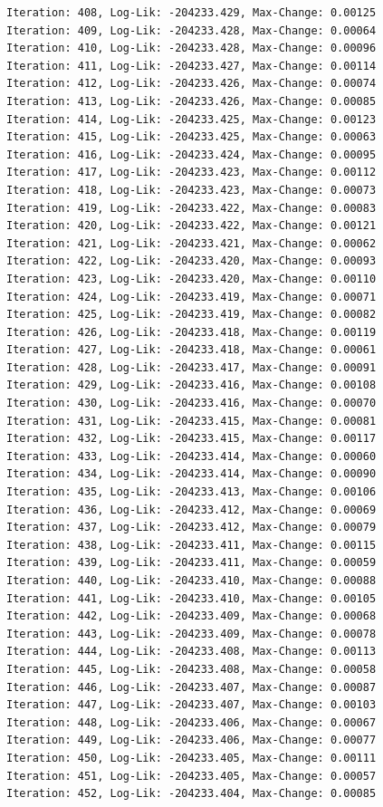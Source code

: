 \documentclass[
  letterpaper,
  DIV=11,
  numbers=noendperiod]{scrreport}
\begin{document}
\begin{verbatim}
Iteration: 408, Log-Lik: -204233.429, Max-Change: 0.00125
Iteration: 409, Log-Lik: -204233.428, Max-Change: 0.00064
Iteration: 410, Log-Lik: -204233.428, Max-Change: 0.00096
Iteration: 411, Log-Lik: -204233.427, Max-Change: 0.00114
Iteration: 412, Log-Lik: -204233.426, Max-Change: 0.00074
Iteration: 413, Log-Lik: -204233.426, Max-Change: 0.00085
Iteration: 414, Log-Lik: -204233.425, Max-Change: 0.00123
Iteration: 415, Log-Lik: -204233.425, Max-Change: 0.00063
Iteration: 416, Log-Lik: -204233.424, Max-Change: 0.00095
Iteration: 417, Log-Lik: -204233.423, Max-Change: 0.00112
Iteration: 418, Log-Lik: -204233.423, Max-Change: 0.00073
Iteration: 419, Log-Lik: -204233.422, Max-Change: 0.00083
Iteration: 420, Log-Lik: -204233.422, Max-Change: 0.00121
Iteration: 421, Log-Lik: -204233.421, Max-Change: 0.00062
Iteration: 422, Log-Lik: -204233.420, Max-Change: 0.00093
Iteration: 423, Log-Lik: -204233.420, Max-Change: 0.00110
Iteration: 424, Log-Lik: -204233.419, Max-Change: 0.00071
Iteration: 425, Log-Lik: -204233.419, Max-Change: 0.00082
Iteration: 426, Log-Lik: -204233.418, Max-Change: 0.00119
Iteration: 427, Log-Lik: -204233.418, Max-Change: 0.00061
Iteration: 428, Log-Lik: -204233.417, Max-Change: 0.00091
Iteration: 429, Log-Lik: -204233.416, Max-Change: 0.00108
Iteration: 430, Log-Lik: -204233.416, Max-Change: 0.00070
Iteration: 431, Log-Lik: -204233.415, Max-Change: 0.00081
Iteration: 432, Log-Lik: -204233.415, Max-Change: 0.00117
Iteration: 433, Log-Lik: -204233.414, Max-Change: 0.00060
Iteration: 434, Log-Lik: -204233.414, Max-Change: 0.00090
Iteration: 435, Log-Lik: -204233.413, Max-Change: 0.00106
Iteration: 436, Log-Lik: -204233.412, Max-Change: 0.00069
Iteration: 437, Log-Lik: -204233.412, Max-Change: 0.00079
Iteration: 438, Log-Lik: -204233.411, Max-Change: 0.00115
Iteration: 439, Log-Lik: -204233.411, Max-Change: 0.00059
Iteration: 440, Log-Lik: -204233.410, Max-Change: 0.00088
Iteration: 441, Log-Lik: -204233.410, Max-Change: 0.00105
Iteration: 442, Log-Lik: -204233.409, Max-Change: 0.00068
Iteration: 443, Log-Lik: -204233.409, Max-Change: 0.00078
Iteration: 444, Log-Lik: -204233.408, Max-Change: 0.00113
Iteration: 445, Log-Lik: -204233.408, Max-Change: 0.00058
Iteration: 446, Log-Lik: -204233.407, Max-Change: 0.00087
Iteration: 447, Log-Lik: -204233.407, Max-Change: 0.00103
Iteration: 448, Log-Lik: -204233.406, Max-Change: 0.00067
Iteration: 449, Log-Lik: -204233.406, Max-Change: 0.00077
Iteration: 450, Log-Lik: -204233.405, Max-Change: 0.00111
Iteration: 451, Log-Lik: -204233.405, Max-Change: 0.00057
Iteration: 452, Log-Lik: -204233.404, Max-Change: 0.00085

\end{verbatim}
\end{document}
